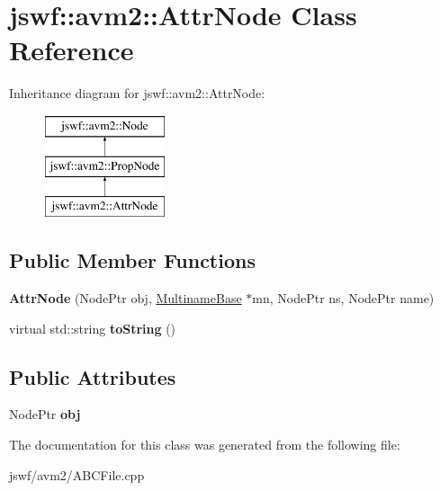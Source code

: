 \hypertarget{classjswf_1_1avm2_1_1_attr_node}{\section{jswf\+:\+:avm2\+:\+:Attr\+Node Class Reference}
\label{classjswf_1_1avm2_1_1_attr_node}
}
Inheritance diagram for jswf\+:\+:avm2\+:\+:Attr\+Node\+:\begin{figure}[H]
\begin{center}
\leavevmode
\includegraphics[height=3.000000cm]{classjswf_1_1avm2_1_1_attr_node}
\end{center}
\end{figure}
\subsection*{Public Member Functions}
\begin{DoxyCompactItemize}
\item 
\hypertarget{classjswf_1_1avm2_1_1_attr_node_aeddc7708d821354addbcc42e227ddcdc}{{\bfseries Attr\+Node} (Node\+Ptr obj, \hyperlink{structjswf_1_1avm2_1_1_multiname_base}{Multiname\+Base} $\ast$mn, Node\+Ptr ns, Node\+Ptr name)}\label{classjswf_1_1avm2_1_1_attr_node_aeddc7708d821354addbcc42e227ddcdc}

\item 
\hypertarget{classjswf_1_1avm2_1_1_attr_node_a2a333fc35a6d74fb2c9d3acc16d90a35}{virtual std\+::string {\bfseries to\+String} ()}\label{classjswf_1_1avm2_1_1_attr_node_a2a333fc35a6d74fb2c9d3acc16d90a35}

\end{DoxyCompactItemize}
\subsection*{Public Attributes}
\begin{DoxyCompactItemize}
\item 
\hypertarget{classjswf_1_1avm2_1_1_attr_node_a1a2192bb9ef59358452e56af183babc5}{Node\+Ptr {\bfseries obj}}\label{classjswf_1_1avm2_1_1_attr_node_a1a2192bb9ef59358452e56af183babc5}

\end{DoxyCompactItemize}


The documentation for this class was generated from the following file\+:\begin{DoxyCompactItemize}
\item 
jswf/avm2/A\+B\+C\+File.\+cpp\end{DoxyCompactItemize}
